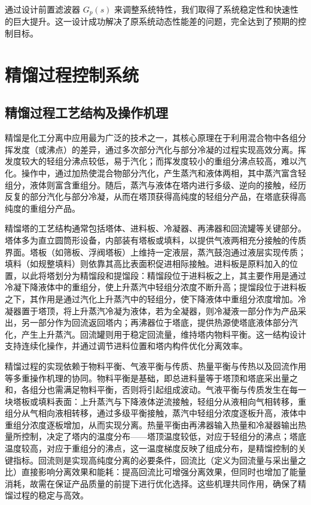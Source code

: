\documentclass[a4paper,zihao=-4]{article}
\numberwithin{equation}{section}
\numberwithin{figure}{section}
\numberwithin{table}{section}
\begin{document}
通过设计前置滤波器 $G_p(s)$ 来调整系统特性，我们取得了系统稳定性和快速性的巨大提升。这一设计成功解决了原系统动态性能差的问题，完全达到了预期的控制目标。

\section{精馏过程控制系统}
\subsection{精馏过程工艺结构及操作机理}
精馏是化工分离中应用最为广泛的技术之一，其核心原理在于利用混合物中各组分挥发度（或沸点）的差异，通过多次部分汽化与部分冷凝的过程实现高效分离。挥发度较大的轻组分沸点较低，易于汽化；而挥发度较小的重组分沸点较高，难以汽化。操作中，通过加热使混合物部分汽化，产生蒸汽和液体两相，其中蒸汽富含轻组分，液体则富含重组分。随后，蒸汽与液体在塔内进行多级、逆向的接触，经历反复的部分汽化与部分冷凝，从而在塔顶获得高纯度的轻组分产品，在塔底获得高纯度的重组分产品。

精馏塔的工艺结构通常包括塔体、进料板、冷凝器、再沸器和回流罐等关键部分。塔体多为直立圆筒形设备，内部装有塔板或填料，以提供气液两相充分接触的传质界面。塔板（如筛板、浮阀塔板）上维持一定液层，蒸汽鼓泡通过液层实现传质；填料（如规整填料）则依靠其高比表面积促进相际接触。进料板是原料加入的位置，以此将塔划分为精馏段和提馏段：精馏段位于进料板之上，其主要作用是通过冷凝下降液体中的重组分，使上升蒸汽中轻组分浓度不断升高；提馏段位于进料板之下，其作用是通过汽化上升蒸汽中的轻组分，使下降液体中重组分浓度增加。冷凝器置于塔顶，将上升蒸汽冷凝为液体，若为全凝器，则冷凝液一部分作为产品采出，另一部分作为回流返回塔内；再沸器位于塔底，提供热源使塔底液体部分汽化，产生上升蒸汽。回流罐则用于稳定回流量，维持塔内物料平衡。这一结构设计支持连续化操作，并通过调节进料位置和塔内构件优化分离效率。

精馏过程的实现依赖于物料平衡、气液平衡与传质、热量平衡与传热以及回流作用等多重操作机理的协同。物料平衡是基础，即总进料量等于塔顶和塔底采出量之和，各组分也需满足物料平衡，否则将引起组成波动。气液平衡与传质发生在每一块塔板或填料表面：上升蒸汽与下降液体逆流接触，轻组分从液相向气相转移，重组分从气相向液相转移，通过多级平衡接触，蒸汽中轻组分浓度逐板升高，液体中重组分浓度逐板增加，从而实现分离。热量平衡由再沸器输入热量和冷凝器输出热量所控制，决定了塔内的温度分布——塔顶温度较低，对应于轻组分的沸点；塔底温度较高，对应于重组分的沸点，这一温度梯度反映了组成分布，是精馏控制的关键指标。回流则是实现高纯度分离的必要条件，回流比（定义为回流量与采出量之比）直接影响分离效果和能耗：提高回流比可增强分离效果，但同时也增加了能量消耗，故需在保证产品质量的前提下进行优化选择。这些机理共同作用，确保了精馏过程的稳定与高效。
\end{document}

